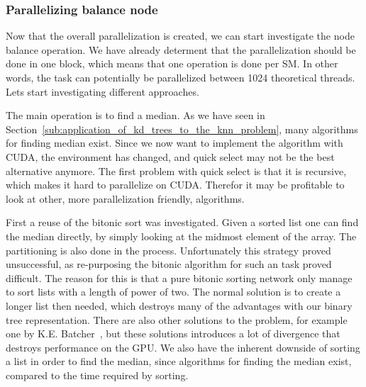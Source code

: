 


\subsubsection{Parallelizing balance node} %
\label{ssub:selecting_a_algorithm}


Now that the overall parallelization is created, we can start investigate the node balance operation. We have already determent that the parallelization should be done in one block, which means that one operation is done per SM\@. In other words, the task can potentially be parallelized between 1024 theoretical threads. Lets start investigating different approaches.

The main operation is to find a median. As we have seen in Section~\ref{sub:application_of_kd_trees_to_the_knn_problem}, many algorithms for finding median exist. Since we now want to implement the algorithm with CUDA, the environment has changed, and quick select may not be the best alternative anymore. The first problem with quick select is that it is recursive, which makes it hard to parallelize on CUDA\@. Therefor it may be profitable to look at other, more parallelization friendly, algorithms.


First a reuse of the bitonic sort was investigated. Given a sorted list one can find the median directly, by simply looking at the midmost element of the array. The partitioning is also done in the process. Unfortunately this strategy proved unsuccessful, as re-purposing the bitonic algorithm for such an task proved difficult. The reason for this is that a pure bitonic sorting network only manage to sort lists with a length of power of two. The normal solution is to create a longer list then needed, which destroys many of the advantages with our binary tree representation. There are also other solutions to the problem, for example one by K.E. Batcher~\cite{Batcher:1968}, but these solutions introduces a lot of divergence that destroys performance on the GPU\@. We also have the inherent downside of sorting a list in order to find the median, since  algorithms for finding the median exist, compared to the  time required by sorting.


